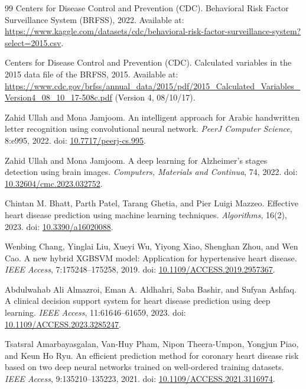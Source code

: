 \begin{thebibliography}{99}
 Centers for Disease Control and Prevention (CDC). Behavioral Risk Factor Surveillance System (BRFSS), 2022. Available at: \url{https://www.kaggle.com/datasets/cdc/behavioral-risk-factor-surveillance-system?select=2015.csv}.

 Centers for Disease Control and Prevention (CDC). Calculated variables in the 2015 data file of the BRFSS, 2015. Available at: \url{https://www.cdc.gov/brfss/annual_data/2015/pdf/2015_Calculated_Variables_Version4_08_10_17-508c.pdf} (Version 4, 08/10/17).

 Zahid Ullah and Mona Jamjoom. An intelligent approach for Arabic handwritten letter recognition using convolutional neural network. \emph{PeerJ Computer Science}, 8:e995, 2022. doi: \href{https://doi.org/10.7717/peerj-cs.995}{10.7717/peerj-cs.995}.

 Zahid Ullah and Mona Jamjoom. A deep learning for Alzheimer's stages detection using brain images. \emph{Computers, Materials and Continua}, 74, 2022. doi: \href{https://doi.org/10.32604/cmc.2023.032752}{10.32604/cmc.2023.032752}.

 Chintan M. Bhatt, Parth Patel, Tarang Ghetia, and Pier Luigi Mazzeo. Effective heart disease prediction using machine learning techniques. \emph{Algorithms}, 16(2), 2023. doi: \href{https://doi.org/10.3390/a16020088}{10.3390/a16020088}.

 Wenbing Chang, Yinglai Liu, Xueyi Wu, Yiyong Xiao, Shenghan Zhou, and Wen Cao. A new hybrid XGBSVM model: Application for hypertensive heart disease. \emph{IEEE Access}, 7:175248--175258, 2019. doi: \href{https://doi.org/10.1109/ACCESS.2019.2957367}{10.1109/ACCESS.2019.2957367}.

 Abdulwahab Ali Almazroi, Eman A. Aldhahri, Saba Bashir, and Sufyan Ashfaq. A clinical decision support system for heart disease prediction using deep learning. \emph{IEEE Access}, 11:61646--61659, 2023. doi: \href{https://doi.org/10.1109/ACCESS.2023.3285247}{10.1109/ACCESS.2023.3285247}.

 Tsatsral Amarbayasgalan, Van-Huy Pham, Nipon Theera-Umpon, Yongjun Piao, and Keun Ho Ryu. An efficient prediction method for coronary heart disease risk based on two deep neural networks trained on well-ordered training datasets. \emph{IEEE Access}, 9:135210--135223, 2021. doi: \href{https://doi.org/10.1109/ACCESS.2021.3116974}{10.1109/ACCESS.2021.3116974}.


\end{thebibliography}
